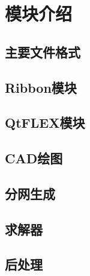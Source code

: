 \chapter{模块介绍}

\section{主要文件格式}

\section{Ribbon模块}

\section{QtFLEX模块}

\section{CAD绘图}

\section{分网生成}

\section{求解器}

\section{后处理}